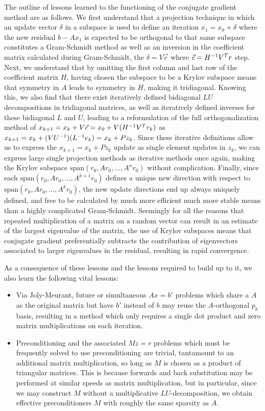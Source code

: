 \documentclass[11pt]{article}
\begin{document}
The outline of lessons learned to the functioning of the conjugate gradient method are as follows. We first understand that a projection technique in which an update vector $\delta$ in a subspace is used to define an iteration $x_1 = x_0 + \delta$ where the new residual $b - Ax_1$ is expected to be orthogonal to that same subspace constitutes a Gram-Schmidt method as well as an inversion in the coefficient matrix calculated during Gram-Schmidt, the $\delta = V\vec c$ where $\vec c = H^{-1} V^T r$ step. Next, we understand that by omitting the first column and last row of the coefficient matrix $H$, having chosen the subspace to be a Krylov subspace means that symmetry in $A$ leads to symmetry in $H$, making it tridiagonal. Knowing this, we also find that there exist iteratively defined bidiagonal $LU$ decompositions in tridiagonal matrices, as well as iteratively defined inverses for these  bidiagonal $L$ and $U$, leading to a reformulation of the full orthogonalization method of $x_{k+1} = x_k + V \vec c = x_0 + V(H^{-1} V^T r_k)$ as $x_{k+1} = x_k + (V U^{-1}) (L^{-1} e_k) = x_k + P z_k$. Since these iterative definitions allow us to express the $x_{k+1} = x_k + Pz_k$ update as single element updates in $z_k$, we can express large single projection methods as iterative methods once again, making the Krylov subspace $\mathrm{span}(r_0,Ar_0,..., A^n r_0)$ without complication. Finally, since each $\mathrm{span}(r_0,Ar_0,..., A^{k+1} r_0)$ defines a unique new direction with respect to $\mathrm{span}(r_0,Ar_0,..., A^k r_0)$, the new update directions end up always uniquely defined, and free to be calculated by much more efficient much more stable means than a highly complicated Gram-Schmidt. Seemingly for all the reasons that repeated multiplication of a matrix on a random vector can result in an estimate of the largest eigenvalue of the matrix, the use of Krylov subspaces means that conjugate gradient preferentially subtracts the contribution of eigenvectors associated to larger eigenvalues in the residual, resulting in rapid convergence.

As a consequence of these lessons and the lessons required to build up to it, we also learn the following vital lessons: \begin{itemize}
\item Via Joly-Meurant, future or simultaneous $Ax = b'$ problems which share a $A$ as the original matrix but have $b'$ instead of $b$ may reuse the $A$-orthogonal $p_k$ basis, resulting in a method which only requires a single dot product and zero matrix multiplications on each iteration.
\item Preconditioning and the associated $Mz = r$ problems which must be frequently solved to use preconditioning are trivial, tantamount to an additional matrix multiplication, so long as $M$ is chosen as a product of triangular matrices. This is because forwards and back substitution may be performed at similar speeds as matrix multiplication, but in particular, since we may construct $M$ without a multiplicative $LU$-decomposition, we obtain effective preconditioners $M$ with roughly the same sparsity as $A$.
\end{itemize}
\end{document}
